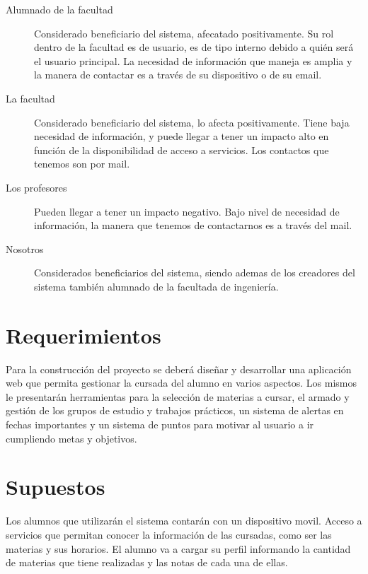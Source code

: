 \documentclass[a4paper,11pt]{article}
\begin{document}
\begin{description}

  \item[Alumnado de la facultad] 

    Considerado beneficiario del sistema, afecatado positivamente. Su rol
    dentro de la facultad es de usuario, es de tipo interno debido a quién será
    el usuario principal. La necesidad de información que maneja es amplia y la
    manera de contactar es a través de su dispositivo o de su email.

  \item[La facultad]

    Considerado beneficiario del sistema, lo afecta positivamente. Tiene baja
    necesidad de información, y puede llegar a tener un impacto alto en función
    de la disponibilidad de acceso a servicios. Los contactos que tenemos son por mail. 
  
  \item[Los profesores]
    
    Pueden llegar a tener un impacto negativo. Bajo nivel de necesidad de
    información, la manera que tenemos de contactarnos es a través del mail.

  \item[Nosotros]
    
    Considerados beneficiarios del sistema, siendo ademas de los creadores del
    sistema también alumnado de la facultada de ingeniería.

\end{description}

\section{Requerimientos}

    Para la construcción del proyecto se deberá diseñar y desarrollar una
    aplicación web que permita gestionar la cursada del alumno en varios
    aspectos. Los mismos le presentarán herramientas para la selección de
    materias a cursar, el armado y gestión de los grupos de estudio y trabajos
    prácticos, un sistema de alertas en fechas importantes y un sistema de
    puntos para motivar al usuario a ir cumpliendo metas y objetivos.

\section{Supuestos}

    Los alumnos que utilizarán el sistema contarán con un dispositivo movil.
    Acceso a servicios que permitan conocer la información de las cursadas, como ser las materias y sus horarios.
    El alumno va a cargar su perfil informando la cantidad de materias que tiene realizadas y las notas de cada una de ellas.
\end{document}
